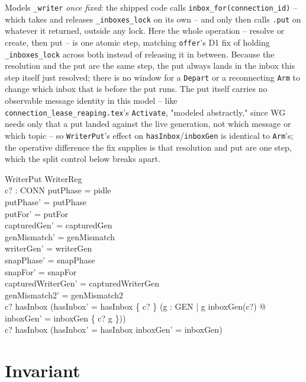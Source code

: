 \documentclass[a4paper,10pt,fleqn]{article}
\begin{document}
Models \texttt{\_writer} \emph{once fixed}: the shipped code calls
\texttt{inbox\_for(connection\_id)} -- which takes and releases
\texttt{\_inboxes\_lock} on its own -- and only then calls \texttt{.put} on
whatever it returned, outside any lock. Here the whole operation -- resolve
or create, then put -- is one atomic step, matching \texttt{offer}'s D1 fix
of holding \texttt{\_inboxes\_lock} across both instead of releasing it in
between. Because the resolution and the put are the same step, the put
always lands in the inbox this step itself just resolved; there is no
window for a \texttt{Depart} or a reconnecting \texttt{Arm} to change which
inbox that is before the put runs. The put itself carries no observable
message identity in this model -- like \texttt{connection\_lease\_reaping.tex}'s
\texttt{Activate}, "modeled abstractly," since WG needs only that a put
landed against the live generation, not which message or which topic --
so \texttt{WriterPut}'s effect on \texttt{hasInbox}/\texttt{inboxGen} is
identical to \texttt{Arm}'s; the operative difference the fix supplies is
that resolution and put are one step, which the split control below breaks
apart.

\begin{schema}{WriterPut}
  \Delta WriterReg \\
  c? : CONN
\where
  putPhase = pidle \\
  putPhase' = putPhase \\
  putFor' = putFor \\
  capturedGen' = capturedGen \\
  genMismatch' = genMismatch \\
  writerGen' = writerGen \\
  snapPhase' = snapPhase \\
  snapFor' = snapFor \\
  capturedWriterGen' = capturedWriterGen \\
  genMismatch2' = genMismatch2 \\
  c? \notin hasInbox \implies
    (hasInbox' = hasInbox \cup \{ c? \} \land
     (\exists g : GEN | g \neq inboxGen(c?) @
       inboxGen' = inboxGen \oplus \{ c? \mapsto g \})) \\
  c? \in hasInbox \implies
    (hasInbox' = hasInbox \land inboxGen' = inboxGen)
\end{schema}

\section{Invariant}
\label{sec:inv}
\end{document}
